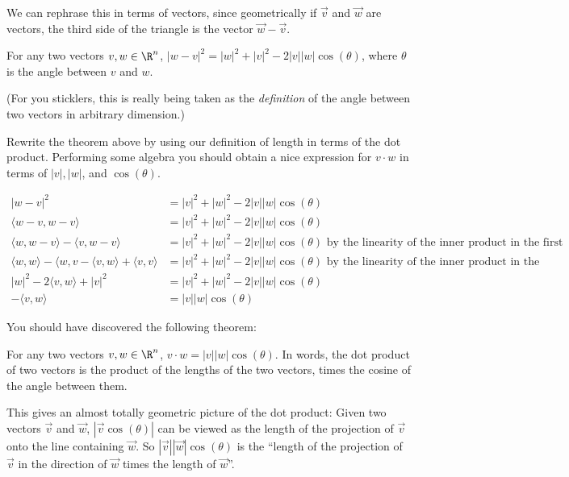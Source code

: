 \documentclass{ximera}
\begin{document}
We can rephrase this in terms of vectors, since geometrically if $\vec{v}$ and $\vec{w}$ are vectors, the third side of the triangle is the vector $\vec{w}-\vec{v}$.


\begin{theorem}
  For any two vectors $v,w \in \R^n$, $|w-v|^2 = |w|^2 +|v|^2 - 2|v| |w| \cos(\theta) $, where $\theta$ is the angle between $v$ and $w$.
\end{theorem}

(For you sticklers, this is really being taken as the \textit{definition} of the angle between two vectors in arbitrary dimension.)

Rewrite the theorem above by using our definition of length in terms of the dot product.  Performing some algebra you should obtain a nice expression for $v\cdot w$ in terms of $|v|, |w|$, and $\cos(\theta)$.

\begin{free-response}
  \begin{align*}
    |w-v|^2 &= |v|^2+|w|^2 - 2|v||w|\cos(\theta)\\
    \langle w-v,w-v\rangle &= |v|^2+|w|^2- 2|v||w|\cos(\theta)\\
    \langle w,w-v\rangle-\langle v,w-v\rangle &= |v|^2+|w|^2- 2|v||w|\cos(\theta) \text{ by the linearity of the inner product in the first slot}\\
    \langle w,w\rangle - \langle{w,v} -\langle v,w \rangle + \langle v,v\rangle&= |v|^2+|w|^2- 2|v||w|\cos(\theta) \text{ by the linearity of the inner product in the second slot}\\
    |w|^2 - 2\langle v,w\rangle + |v|^2 &= |v|^2+|w|^2- 2|v||w|\cos(\theta)\\
    -\langle v,w\rangle &= |v||w|\cos(\theta)
  \end{align*}
\end{free-response} 

You should have discovered the following theorem:
 
\begin{theorem}
  For any two vectors $v,w \in \R^n$, $v \cdot w =
  |v||w|\cos(\theta)$.  In words, the dot product of two vectors is
  the product of the lengths of the two vectors, times the cosine of
  the angle between them.
\end{theorem}
 
This gives an almost totally geometric picture of the dot product:
Given two vectors $\vec{v}$ and $\vec{w}$, $|\vec{v}\cos(\theta)|$ can
be viewed as the length of the projection of $\vec{v}$ onto the line
containing $\vec{w}$.  So $|\vec{v}||\vec{w}|\cos(\theta)$ is the
``length of the projection of $\vec{v}$ in the direction of $\vec{w}$
times the length of $\vec{w}$''.
 
\end{document}
